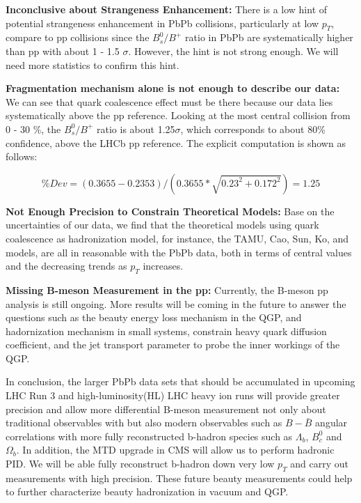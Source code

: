 \textbf{Inconclusive about Strangeness Enhancement:} There is a low hint of potential strangeness enhancement in PbPb collisions, particularly at low $p_T$, compare to pp collisions since the $B^0_s/B^+$ ratio in PbPb are systematically higher than pp with about 1 - 1.5 $\sigma$. However, the hint is not strong enough. We will need more statistics to confirm this hint.

\textbf{Fragmentation mechanism alone is not enough to describe our data:} We can see that quark coalescence effect must be there because our data lies systematically above the pp reference. Looking at the most central collision from 0 - 30 \%, the $B^0_s/B^+$ ratio is about 1.25$\sigma$, which corresponds to about 80\% confidence, above the LHCb pp reference. The explicit computation is shown as follows:

\begin{equation}
\% Dev = (0.3655 - 0.2353)/(0.3655 * \sqrt{0.23^2 + 0.172^2}) = 1.25 
\end{equation}


\textbf{Not Enough Precision to Constrain Theoretical Models:} Base on the uncertainties of our data, we find that the theoretical models using quark coalescence as hadronization model, for instance, the TAMU, Cao, Sun, Ko, and models, are all in reasonable with the PbPb data, both in terms of central values and the decreasing trends as $p_T$ increases.

\textbf{Missing B-meson Measurement in the pp:} Currently, the B-meson pp analysis is still ongoing. More results will be coming in the future to answer the questions such as the beauty energy loss mechanism in the QGP, and hadornization mechanism in small systems, constrain heavy quark diffusion coefficient, and the jet transport parameter to probe the inner workings of the QGP.

In conclusion, the larger PbPb data sets that should be accumulated in upcoming LHC Run 3 and high-luminosity(HL) LHC heavy ion runs will provide greater precision and allow more differential B-meson measurement not only about traditional observables with but also modern observables such as $B-\bar B$ angular correlations with more fully reconstructed b-hadron species such as $\Lambda_b$, $B^0_c$ and $\Omega_b$. In addition, the MTD upgrade in CMS will allow us to perform hadronic PID. We will be able fully reconstruct b-hadron down very low $p_T$ and carry out measurements with high precision. These future beauty measurements could help to further characterize beauty hadronization in vacuum and QGP.


